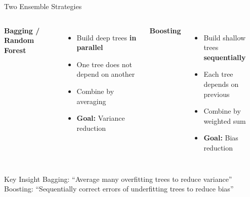 \documentclass[10pt]{beamer}
\newcommand{\highlight}[1]{\textcolor{AccentOrange}{\textbf{#1}}}
\begin{document}

\begin{frame}{Two Ensemble Strategies}

  \begin{columns}[T]
    \textbf{Bagging / Random Forest}
    \begin{itemize}
      \item Build deep trees \highlight{in parallel}
      \item One tree does not depend on another
      \item Combine by averaging
      \item \textbf{Goal:} Variance reduction
    \end{itemize}

    \textbf{Boosting}
    \begin{itemize}
      \item Build shallow trees \highlight{sequentially}
      \item Each tree depends on previous
      \item Combine by weighted sum
      \item \textbf{Goal:} Bias reduction
    \end{itemize}
  \end{columns}

  \vspace{1em}
  \begin{block}{Key Insight}
    Bagging: ``Average many overfitting trees to reduce variance''\\
    Boosting: ``Sequentially correct errors of underfitting trees to reduce bias''
  \end{block}
\end{frame}

\end{document}
